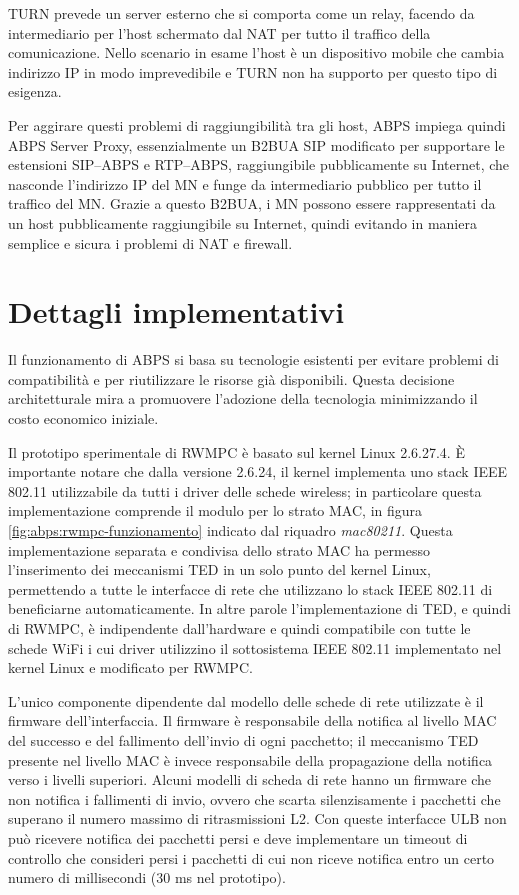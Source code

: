\documentclass[12pt,a4paper,openright,twoside]{book}
\begin{document}
TURN prevede un server esterno che si comporta come un relay, facendo
da intermediario per l'host schermato dal NAT per tutto il traffico
della comunicazione. Nello scenario in esame l'host è un dispositivo
mobile che cambia indirizzo IP in modo imprevedibile e TURN non ha
supporto per questo tipo di esigenza.

Per aggirare questi problemi di raggiungibilità tra gli host, ABPS
impiega quindi ABPS Server Proxy, essenzialmente un B2BUA SIP
modificato per supportare le estensioni SIP--ABPS e RTP--ABPS,
raggiungibile pubblicamente su Internet, che nasconde l'indirizzo IP
del MN e funge da intermediario pubblico per tutto il traffico del
MN. Grazie a questo B2BUA, i MN possono essere rappresentati da un
host pubblicamente raggiungibile su Internet, quindi evitando in
maniera semplice e sicura i problemi di NAT e firewall.

\section{Dettagli implementativi}

Il funzionamento di ABPS si basa su tecnologie esistenti per evitare
problemi di compatibilità e per riutilizzare le risorse già
disponibili. Questa decisione architetturale mira a promuovere
l'adozione della tecnologia minimizzando il costo economico iniziale.

Il prototipo sperimentale di RWMPC è basato sul kernel Linux
2.6.27.4. È importante notare che dalla versione 2.6.24, il kernel
implementa uno stack IEEE 802.11 utilizzabile da tutti i driver delle
schede wireless; in particolare questa implementazione comprende il
modulo per lo strato MAC, in figura \ref{fig:abps:rwmpc-funzionamento}
indicato dal riquadro \emph{mac80211}. Questa implementazione separata
e condivisa dello strato MAC ha permesso l'inserimento dei meccanismi
TED in un solo punto del kernel Linux, permettendo a tutte le
interfacce di rete che utilizzano lo stack IEEE 802.11 di beneficiarne
automaticamente. In altre parole l'implementazione di TED, e quindi di
RWMPC, è indipendente dall'hardware e quindi compatibile con tutte le
schede WiFi i cui driver utilizzino il sottosistema IEEE 802.11
implementato nel kernel Linux e modificato per RWMPC.

L'unico componente dipendente dal modello delle schede di rete
utilizzate è il firmware dell'interfaccia. Il firmware è responsabile
della notifica al livello MAC del successo e del fallimento dell'invio
di ogni pacchetto; il meccanismo TED presente nel livello MAC è invece
responsabile della propagazione della notifica verso i livelli
superiori. Alcuni modelli di scheda di rete hanno un firmware che non
notifica i fallimenti di invio, ovvero che scarta silenzisamente i
pacchetti che superano il numero massimo di ritrasmissioni L2. Con
queste interfacce ULB non può ricevere notifica dei pacchetti persi e
deve implementare un timeout di controllo che consideri persi i
pacchetti di cui non riceve notifica entro un certo numero di
millisecondi (30 ms nel prototipo).
\end{document}
